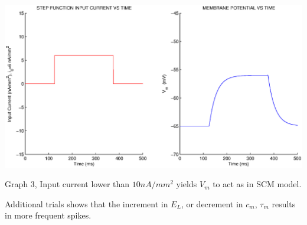 \documentclass{article}
\begin{document}
\begin{center}

\includegraphics[width=\textwidth]{q10.eps}

Graph 3, Input current lower than $10 nA/mm^{2}$ yields $V_{m}$ to act as in SCM model.
\end{center}
Additional trials shows that the increment in $E_{L}$, or decrement in $c_{m}$, $\tau_{m}$ results in more frequent spikes.
\end{document}
